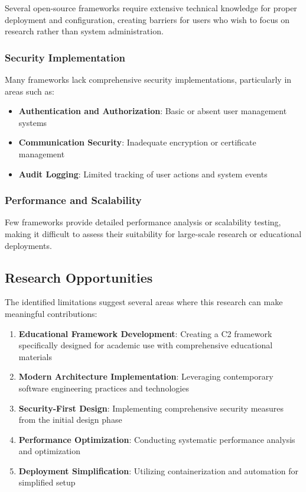 Several open-source frameworks require extensive technical knowledge for proper deployment and configuration, creating barriers for users who wish to focus on research rather than system administration.

\subsubsection{Security Implementation}

Many frameworks lack comprehensive security implementations, particularly in areas such as:

\begin{itemize}
\item \textbf{Authentication and Authorization}: Basic or absent user management systems
\item \textbf{Communication Security}: Inadequate encryption or certificate management
\item \textbf{Audit Logging}: Limited tracking of user actions and system events
\end{itemize}

\subsubsection{Performance and Scalability}

Few frameworks provide detailed performance analysis or scalability testing, making it difficult to assess their suitability for large-scale research or educational deployments.

\subsection{Research Opportunities}
\label{subsec:research_opportunities}

The identified limitations suggest several areas where this research can make meaningful contributions:

\begin{enumerate}
\item \textbf{Educational Framework Development}: Creating a C2 framework specifically designed for academic use with comprehensive educational materials
\item \textbf{Modern Architecture Implementation}: Leveraging contemporary software engineering practices and technologies
\item \textbf{Security-First Design}: Implementing comprehensive security measures from the initial design phase
\item \textbf{Performance Optimization}: Conducting systematic performance analysis and optimization
\item \textbf{Deployment Simplification}: Utilizing containerization and automation for simplified setup
\end{enumerate}

